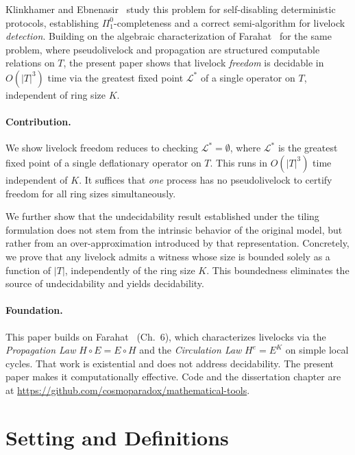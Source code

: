 \documentclass{article}
\newcommand{\Ls}{\mathcal{L}^{*}}
\begin{document}
Klinkhamer and Ebnenasir~\citep{klinkhamer2013,klinkhamer2019} study
this problem for self-disabling deterministic protocols, establishing
$\Pi^0_1$-completeness and a correct semi-algorithm for livelock
\emph{detection}.  Building on the algebraic characterization of
Farahat~\citep{farahat2012} for the same problem, where pseudolivelock and propagation are
structured computable relations on $T$, the present paper shows that
livelock \emph{freedom} is decidable in $O(|T|^3)$ time via the
greatest fixed point $\Ls$ of a single operator on $T$, independent of
ring size $K$.

\paragraph{Contribution.}
We show livelock freedom reduces to checking $\Ls = \emptyset$, where
$\Ls$ is the greatest fixed point of a single deflationary operator on
$T$. This runs in $O(|T|^3)$ time independent of $K$. It suffices that
\emph{one} process has no pseudolivelock to certify freedom for all
ring sizes simultaneously.

We further show that the undecidability result established under the tiling formulation does not stem from the intrinsic behavior of the original model, but rather from an over-approximation introduced by that representation. Concretely, we prove that any livelock admits a witness whose size is bounded solely as a function of $|T|$, independently of the ring size $K$. This boundedness eliminates the source of undecidability and yields decidability.

\paragraph{Foundation.}
This paper builds on Farahat~\citep{farahat2012} (Ch.~6), which
characterizes livelocks via the \emph{Propagation Law}
$H\!\circ\!E = E\!\circ\!H$ and the \emph{Circulation Law}
$H^{e} = E^K$ on simple local cycles. That work is existential and does
not address decidability. The present paper makes it computationally
effective. Code and the dissertation chapter are at
\url{https://github.com/cosmoparadox/mathematical-tools}.

\section{Setting and Definitions}
\end{document}
